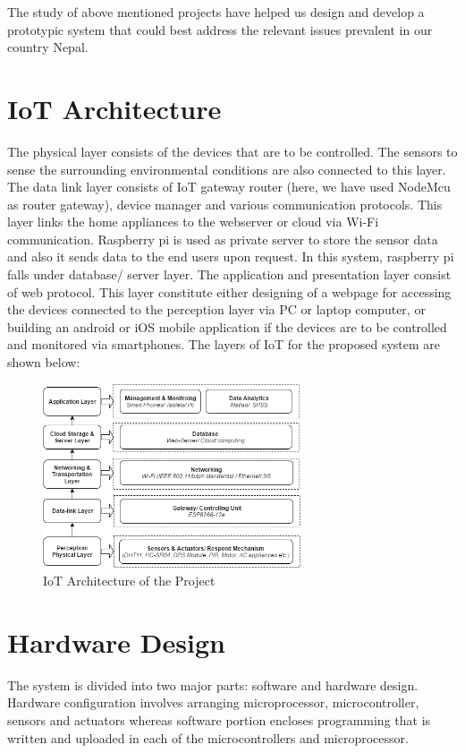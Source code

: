 \documentclass[journal,twoside]{IEEEtran}
\begin{document}
The study of above mentioned projects have helped us design
and develop a prototypic system that could best address the
relevant issues prevalent in our country Nepal.

\section{IoT Architecture}

The physical layer consists of the devices that are to be
controlled. The sensors to sense the surrounding environmental
conditions are also connected to this layer. The data link layer
consists of IoT gateway router (here, we have used NodeMcu
as router gateway), device manager and various communication
protocols. This layer links the home appliances to the webserver
or cloud via Wi-Fi communication. Raspberry pi is used as
private server to store the sensor data and also it sends data to
the end users upon request. In this system, raspberry pi falls
under database/ server layer. The application and presentation
layer consist of web protocol. This layer constitute either
designing of a webpage for accessing the devices connected to
the perception layer via PC or laptop computer, or building an
android or iOS mobile application if the devices are to be
controlled and monitored via smartphones. The layers of IoT for
the proposed system are shown below:

\begin{figure}[!t]
\centering
\includegraphics[width=3.0in]{figure1}
\caption{IoT Architecture of the Project}
\label{fig:artchitecture}
\end{figure}

\section{Hardware Design}
The system is divided into two major parts: software and
hardware design. Hardware configuration involves arranging
microprocessor, microcontroller, sensors and actuators whereas
software portion encloses programming that is written and
uploaded in each of the microcontrollers and microprocessor.
\end{document}
